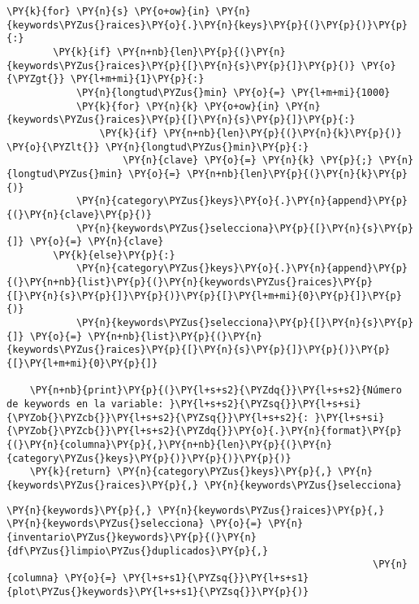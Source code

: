 \begin{tcolorbox}[breakable, size=fbox, boxrule=1pt, pad at break*=1mm,colback=cellbackground, colframe=cellborder]
\begin{Verbatim}[commandchars=\\\{\}]
    \PY{k}{for} \PY{n}{s} \PY{o+ow}{in} \PY{n}{keywords\PYZus{}raices}\PY{o}{.}\PY{n}{keys}\PY{p}{(}\PY{p}{)}\PY{p}{:}
        \PY{k}{if} \PY{n+nb}{len}\PY{p}{(}\PY{n}{keywords\PYZus{}raices}\PY{p}{[}\PY{n}{s}\PY{p}{]}\PY{p}{)} \PY{o}{\PYZgt{}} \PY{l+m+mi}{1}\PY{p}{:}  
            \PY{n}{longtud\PYZus{}min} \PY{o}{=} \PY{l+m+mi}{1000}
            \PY{k}{for} \PY{n}{k} \PY{o+ow}{in} \PY{n}{keywords\PYZus{}raices}\PY{p}{[}\PY{n}{s}\PY{p}{]}\PY{p}{:}
                \PY{k}{if} \PY{n+nb}{len}\PY{p}{(}\PY{n}{k}\PY{p}{)} \PY{o}{\PYZlt{}} \PY{n}{longtud\PYZus{}min}\PY{p}{:}
                    \PY{n}{clave} \PY{o}{=} \PY{n}{k} \PY{p}{;} \PY{n}{longtud\PYZus{}min} \PY{o}{=} \PY{n+nb}{len}\PY{p}{(}\PY{n}{k}\PY{p}{)}            
            \PY{n}{category\PYZus{}keys}\PY{o}{.}\PY{n}{append}\PY{p}{(}\PY{n}{clave}\PY{p}{)}
            \PY{n}{keywords\PYZus{}selecciona}\PY{p}{[}\PY{n}{s}\PY{p}{]} \PY{o}{=} \PY{n}{clave}
        \PY{k}{else}\PY{p}{:}
            \PY{n}{category\PYZus{}keys}\PY{o}{.}\PY{n}{append}\PY{p}{(}\PY{n+nb}{list}\PY{p}{(}\PY{n}{keywords\PYZus{}raices}\PY{p}{[}\PY{n}{s}\PY{p}{]}\PY{p}{)}\PY{p}{[}\PY{l+m+mi}{0}\PY{p}{]}\PY{p}{)}
            \PY{n}{keywords\PYZus{}selecciona}\PY{p}{[}\PY{n}{s}\PY{p}{]} \PY{o}{=} \PY{n+nb}{list}\PY{p}{(}\PY{n}{keywords\PYZus{}raices}\PY{p}{[}\PY{n}{s}\PY{p}{]}\PY{p}{)}\PY{p}{[}\PY{l+m+mi}{0}\PY{p}{]}
                   
    \PY{n+nb}{print}\PY{p}{(}\PY{l+s+s2}{\PYZdq{}}\PY{l+s+s2}{Número de keywords en la variable: }\PY{l+s+s2}{\PYZsq{}}\PY{l+s+si}{\PYZob{}\PYZcb{}}\PY{l+s+s2}{\PYZsq{}}\PY{l+s+s2}{: }\PY{l+s+si}{\PYZob{}\PYZcb{}}\PY{l+s+s2}{\PYZdq{}}\PY{o}{.}\PY{n}{format}\PY{p}{(}\PY{n}{columna}\PY{p}{,}\PY{n+nb}{len}\PY{p}{(}\PY{n}{category\PYZus{}keys}\PY{p}{)}\PY{p}{)}\PY{p}{)}
    \PY{k}{return} \PY{n}{category\PYZus{}keys}\PY{p}{,} \PY{n}{keywords\PYZus{}raices}\PY{p}{,} \PY{n}{keywords\PYZus{}selecciona}
\end{Verbatim}
\end{tcolorbox}

    \begin{tcolorbox}[breakable, size=fbox, boxrule=1pt, pad at break*=1mm,colback=cellbackground, colframe=cellborder]
\begin{Verbatim}[commandchars=\\\{\}]
\PY{n}{keywords}\PY{p}{,} \PY{n}{keywords\PYZus{}raices}\PY{p}{,} \PY{n}{keywords\PYZus{}selecciona} \PY{o}{=} \PY{n}{inventario\PYZus{}keywords}\PY{p}{(}\PY{n}{df\PYZus{}limpio\PYZus{}duplicados}\PY{p}{,}
                                                               \PY{n}{columna} \PY{o}{=} \PY{l+s+s1}{\PYZsq{}}\PY{l+s+s1}{plot\PYZus{}keywords}\PY{l+s+s1}{\PYZsq{}}\PY{p}{)}
\end{Verbatim}
\end{tcolorbox}

